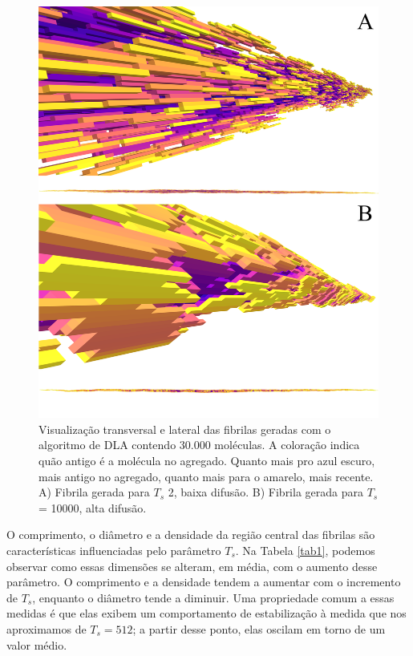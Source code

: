 \documentclass{article}
\begin{document}
    \begin{figure}[H]
        \centering
        \includegraphics[width=\textwidth]{figures/fibrils.png}

        \caption{Visualização transversal e lateral das fibrilas geradas com o algoritmo de DLA contendo 30.000 moléculas.
        A coloração indica quão antigo é a molécula no agregado. Quanto mais pro azul escuro, 
        mais antigo no agregado, quanto mais para o amarelo, mais recente. 
        A) Fibrila gerada para \(T_{s}\) 2, baixa difusão. B) Fibrila gerada para \(T_{s}\) = 10000, alta difusão.} 

        \label{R1}
    \end{figure}

    O comprimento, o diâmetro e a densidade da região central das fibrilas são características influenciadas pelo 
    parâmetro \(T_{s}\). Na Tabela \ref{tab1}, podemos observar como essas dimensões se alteram, em média, com o 
    aumento desse parâmetro. O comprimento e a densidade tendem a aumentar com o incremento de \(T_{s}\), enquanto 
    o diâmetro tende a diminuir. Uma propriedade comum a essas medidas é que elas exibem um comportamento de 
    estabilização à medida que nos aproximamos de \(T_{s} = 512\); a partir desse ponto, elas oscilam em torno de um 
    valor médio. 
\end{document}
